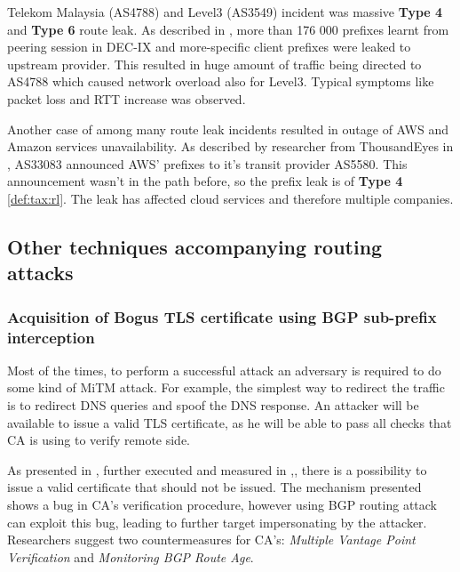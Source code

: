 Telekom Malaysia (AS4788) and Level3 (AS3549) incident was massive \textbf{Type 4} and \textbf{Type 6} route leak. As described in \cite{Toonk2015}, more than 176 000 prefixes learnt from peering session in DEC-IX and more-specific client prefixes were leaked to upstream provider. This resulted in huge amount of traffic being directed to AS4788 which caused network overload also for Level3. Typical symptoms like packet loss and RTT increase was observed. 

Another case of among many route leak incidents resulted in outage of AWS and Amazon services unavailability. As described by researcher from ThousandEyes in \cite{Kephart2015}, AS33083 announced AWS' prefixes to it's transit provider AS5580. This announcement wasn't in the path before, so the prefix leak is of \textbf{Type 4} \ref{def:tax:rl}. The leak has affected cloud services and therefore multiple companies.





\subsection{Other techniques accompanying routing attacks}
\label{def:mitm}
\subsubsection{Acquisition of Bogus TLS certificate using BGP sub-prefix interception}
Most of the times, to perform a successful attack an adversary is required to do some kind of MiTM attack.
For example, the simplest way to redirect the traffic is to redirect DNS queries and spoof the DNS response.
An attacker will be available to issue a valid TLS certificate, as he will be able to pass all checks that CA is using to verify remote side.
\cite{Gavrichenkov2015}


As presented in \cite{Gavrichenkov2015}, further executed and measured in \cite{BirgeLee2017},\cite{BirgeLee2018}, there is a possibility to issue a valid certificate that should not be issued. The mechanism presented shows a bug in CA's verification procedure, however using BGP routing attack can exploit this bug, leading to further target impersonating by the attacker.
Researchers suggest two countermeasures for CA's: \emph{Multiple Vantage Point Verification} and \emph{Monitoring BGP Route Age}.

